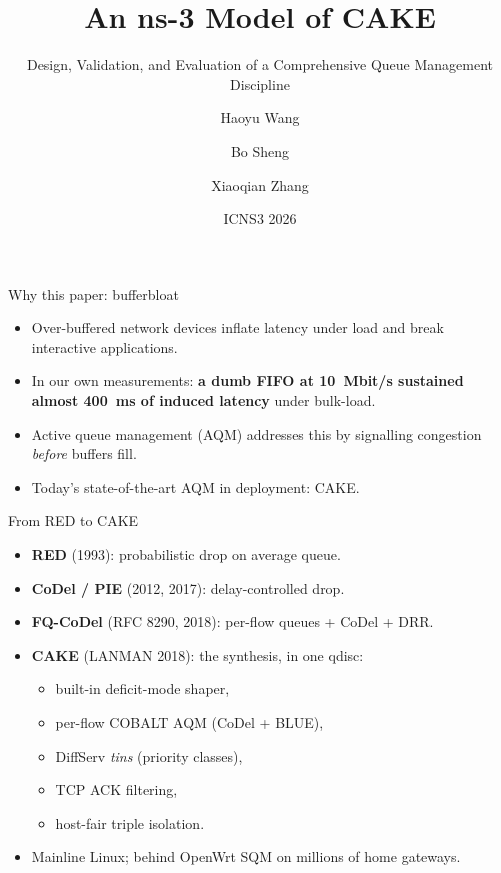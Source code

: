 \documentclass[10pt,aspectratio=169]{beamer}
\title[ns-3 Model of CAKE]{An ns-3 Model of CAKE}
\subtitle{Design, Validation, and Evaluation of a Comprehensive Queue
Management Discipline}
\author[Wang, Sheng, Zhang]{Haoyu Wang\inst{1} \and Bo Sheng\inst{1} \and Xiaoqian Zhang\inst{2}}
\institute[UMB / UNO]{%
\inst{1}University of Massachusetts Boston \and
\inst{2}University of Nebraska Omaha}
\date{ICNS3 2026}
\begin{document}
\begin{frame}
\titlepage
\end{frame}

\begin{frame}{Why this paper: bufferbloat}
\begin{itemize}
  \item Over-buffered network devices inflate latency under load and break
        interactive applications.
  \item In our own measurements: \textbf{a dumb FIFO at 10~Mbit/s sustained
        almost 400~ms of induced latency} under bulk-load.
  \item Active queue management (AQM) addresses this by signalling congestion
        \emph{before} buffers fill.
  \item Today's state-of-the-art AQM in deployment: \alert{CAKE}.
\end{itemize}
\end{frame}

\begin{frame}{From RED to CAKE}
\begin{itemize}
  \item \textbf{RED} (1993): probabilistic drop on average queue.
  \item \textbf{CoDel / PIE} (2012, 2017): delay-controlled drop.
  \item \textbf{FQ-CoDel} (RFC 8290, 2018): per-flow queues + CoDel + DRR.
  \item \textbf{CAKE} (LANMAN 2018): the synthesis, in one qdisc:
    \begin{itemize}
      \item built-in deficit-mode shaper,
      \item per-flow COBALT AQM (CoDel + BLUE),
      \item DiffServ \emph{tins} (priority classes),
      \item TCP ACK filtering,
      \item host-fair triple isolation.
    \end{itemize}
  \item Mainline Linux; behind OpenWrt SQM on millions of home gateways.
\end{itemize}
\end{frame}
\end{document}
